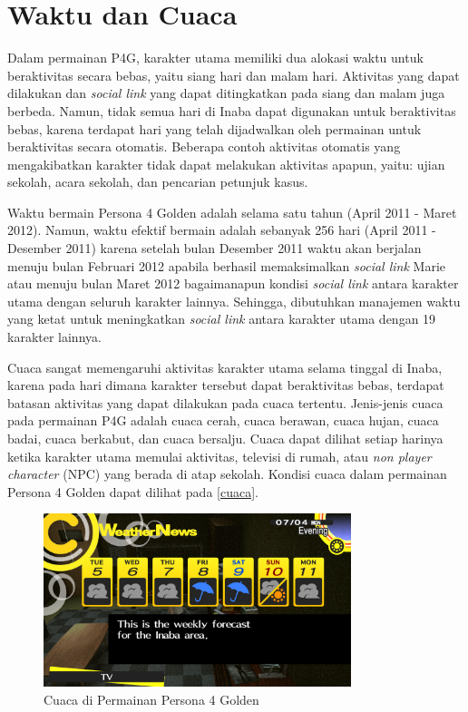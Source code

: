 

\section{Waktu dan Cuaca}
Dalam permainan P4G, karakter utama memiliki dua alokasi waktu untuk beraktivitas secara bebas, yaitu siang hari dan malam hari. Aktivitas yang dapat dilakukan dan \textit{social link} yang dapat ditingkatkan pada siang dan malam juga berbeda.
Namun, tidak semua hari di Inaba dapat digunakan untuk beraktivitas bebas, karena terdapat hari yang telah dijadwalkan oleh permainan untuk beraktivitas secara otomatis.
Beberapa contoh aktivitas otomatis yang mengakibatkan karakter tidak dapat melakukan aktivitas apapun, yaitu: ujian sekolah, acara sekolah, dan pencarian petunjuk kasus.

Waktu bermain Persona 4 Golden adalah selama satu tahun (April 2011 - Maret 2012). Namun, waktu efektif bermain adalah sebanyak 256 hari (April 2011 - Desember 2011) karena setelah bulan Desember 2011 waktu akan berjalan menuju bulan Februari 2012 apabila berhasil memaksimalkan \textit{social link} Marie atau menuju bulan Maret 2012 bagaimanapun kondisi \textit{social link} antara karakter utama dengan seluruh karakter lainnya. Sehingga, dibutuhkan manajemen waktu yang ketat untuk meningkatkan \textit{social link} antara karakter utama dengan 19 karakter lainnya.

Cuaca sangat memengaruhi aktivitas karakter utama selama tinggal di Inaba, karena pada hari dimana karakter tersebut dapat beraktivitas bebas, terdapat batasan aktivitas yang dapat dilakukan pada cuaca tertentu. Jenis-jenis cuaca pada permainan P4G adalah cuaca cerah, cuaca berawan, cuaca hujan, cuaca badai, cuaca berkabut, dan cuaca bersalju. Cuaca dapat dilihat setiap harinya ketika karakter utama memulai aktivitas, televisi di rumah, atau \textit{non player character} (NPC) yang berada di atap sekolah. Kondisi cuaca dalam permainan Persona 4 Golden dapat dilihat pada \autoref{cuaca}.

\begin{figure}[htbp]
    \centering
    \includegraphics[width=0.8\textwidth]{resources/Dokumentasi/Screenshot (461).png}
    \caption{\label{cuaca}Cuaca di Permainan Persona 4 Golden}
\end{figure}

